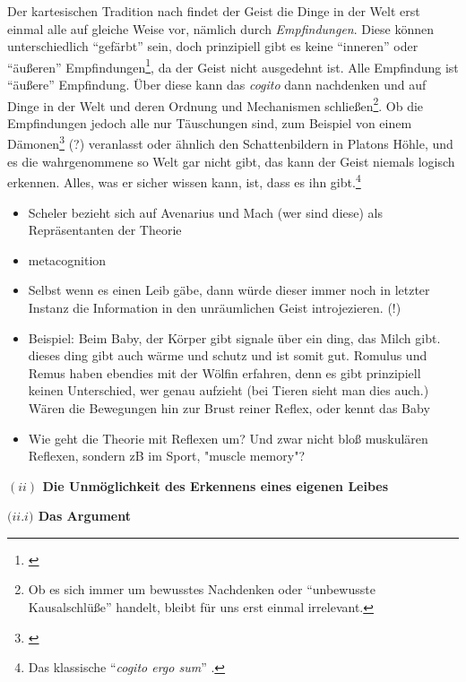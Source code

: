 \documentclass[a4paper, 12pt]{article}
\begin{document}
\begin{onehalfspace}
Der kartesischen Tradition nach findet der Geist die Dinge in der Welt erst einmal alle auf gleiche Weise vor, nämlich durch \emph{Empfindungen}. Diese können unterschiedlich "`gefärbt"' sein, doch prinzipiell gibt es keine "`inneren"' oder "`äußeren"' Empfindungen\footnote{\Cite[Vgl.][S. ?? (501?)]{scheler-ethik}}, da der Geist nicht ausgedehnt ist. Alle Empfindung ist "`äußere"' Empfindung. Über diese kann das \emph{cogito} dann nachdenken und auf Dinge in der Welt und deren Ordnung und Mechanismen schließen\footnote{Ob es sich immer um bewusstes Nachdenken oder "`unbewusste Kausalschlüße"' handelt, bleibt für uns erst einmal irrelevant.}. Ob die Empfindungen jedoch alle nur Täuschungen sind, zum Beispiel von einem Dämonen\footnote{\Cite[Vgl.][S.?]{descartes}} (?) veranlasst oder ähnlich den Schattenbildern in Platons Höhle, und es die wahrgenommene so Welt gar nicht gibt, das kann der Geist niemals logisch erkennen. Alles, was er sicher wissen kann, ist, dass es ihn gibt.\footnote{Das klassische "`\emph{cogito ergo sum}"' .}


\begin{itemize}
  \item Scheler bezieht sich auf Avenarius und Mach (wer sind diese) als Repräsentanten der Theorie
  \item metacognition
  \item Selbst wenn es einen Leib gäbe, dann würde dieser immer noch in letzter Instanz die Information in den unräumlichen Geist introjezieren. (!)
  \item Beispiel: Beim Baby, der Körper gibt signale über ein ding, das Milch gibt. dieses ding gibt auch wärme und schutz und ist somit gut. Romulus und Remus haben ebendies mit der Wölfin erfahren, denn es gibt prinzipiell keinen Unterschied, wer genau aufzieht (bei Tieren sieht man dies auch.) Wären die Bewegungen hin zur Brust reiner Reflex, oder kennt das Baby 
  \item Wie geht die Theorie mit Reflexen um? Und zwar nicht bloß muskulären Reflexen, sondern zB im Sport, "muscle memory"?
\end{itemize}


\vspace{5mm}
\noindent\textbf{$(ii)$ Die Unmöglichkeit des Erkennens eines eigenen Leibes}

\vspace{3mm}
\noindent\textbf{$(ii.$\footnotesize$i$\normalsize$)$ Das Argument}


\end{onehalfspace}
\end{document}
